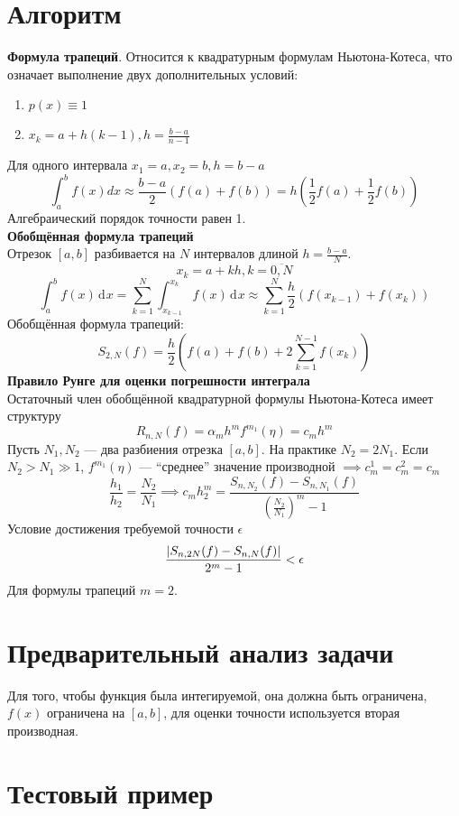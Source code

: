 \documentclass[a4paper]{article}
\newcommand{\dd}[1][]{\ensuremath{\,\mathrm{d}^{#1}}}
\DeclarePairedDelimiter{\abs}{\lvert}{\rvert}
\begin{document}
\section{Алгоритм}\label{sec:S2}
\textbf{Формула трапеций}. Относится к квадратурным формулам Ньютона-Котеса, что означает выполнение двух
дополнительных условий:
\begin{enumerate}
  \item \(p(x) \equiv 1\)
  \item \(x_{k} = a + h(k-1), h = \frac{b-a}{n-1}\)
\end{enumerate}
Для одного интервала \(x_{1} = a, x_{2} = b, h = b-a\) \[
  \int_a^b f(x)dx \approx \frac{b-a}{2}(f(a) + f(b)) = h\left( \frac{1}{2}f(a) + \frac{1}{2}f(b) \right)
\]
Алгебраический порядок точности равен 1.\\
\textbf{Обобщённая формула трапеций}\\
Отрезок \([a,b]\) разбивается на \(N\) интервалов длиной \(h = \frac{b-a}{N}\). \[
  x_{k} = a + kh, k = \overline{0,N}
\]\[
  \int_a^b f(x)\dd x = \sum_{k=1}^N \int_{x_{k-1}}^{x_{k}}f(x)\dd x \approx \sum_{k=1}^N \frac{h}{2}(f(x_{k-1})+f(x_{k}))
\]
Обобщённая формула трапеций: \begin{equation} \label{eq:1}
  S_{2,N}(f) = \frac{h}{2}\left( f(a) + f(b) + 2 \sum_{k=1}^{N-1} f(x_{k}) \right) \tag{*}
\end{equation}
\textbf{Правило Рунге для оценки погрешности интеграла}\\
Остаточный член обобщённой квадратурной формулы Ньютона-Котеса имеет структуру \[
  R_{n,N}(f) = \alpha_{m}h^{m}f^{m_{1}}(\eta) = c_{m}h^{m}
\]
Пусть \(N_{1},N_2\) --- два разбиения отрезка \([a,b]\). На практике \(N_2 = 2N_1\). Если \(N_{2} > N_{1} \gg 1\),
\(f^{m_{1}}(\eta)\) --- ``среднее'' значение производной \(\implies c_{m}^{1} = c_{m}^2 = c_{m}\) \[
  \frac{h_{1}}{h_{2}} = \frac{N_{2}}{N_{1}} \implies c_{m}h^{m}_{2} = \frac{S_{n,N_{2}}(f)-S_{n,N_1}(f)}{\left(\frac{N_2}{N_1}\right)^{m} - 1}
\]
Условие достижения требуемой точности \(\epsilon\) \[
  \frac{\abs{S_{n,2N}(f)-S_{n,N}(f)}}{2^{m} - 1} < \epsilon
\]
Для формулы трапеций \(m = 2\).
\section{Предварительный анализ задачи}\label{sec:S3}

Для того, чтобы функция была интегируемой, она должна быть ограничена, \(f(x)\) ограничена на \([a,b]\), для оценки
точности используется вторая производная.
\section{Тестовый пример}\label{sec:S5}
\end{document}
